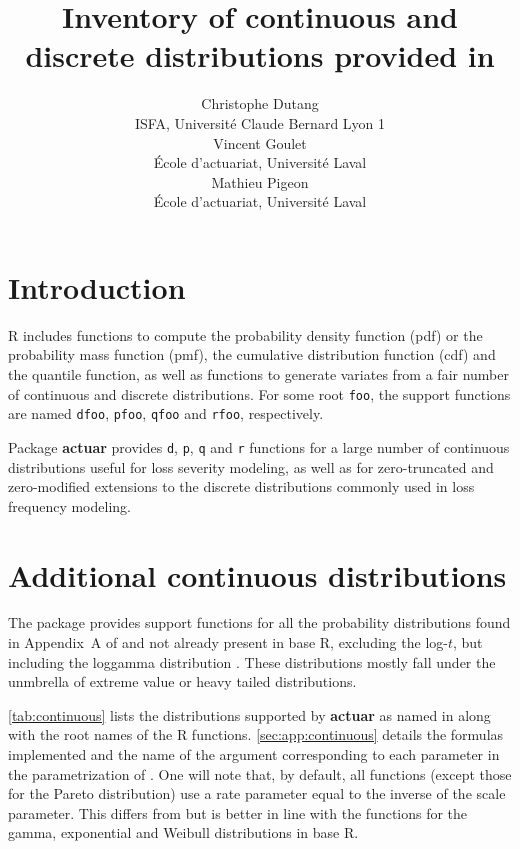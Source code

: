 \documentclass[x11names]{article}
\title{Inventory of continuous and discrete distributions provided
    in \pkg{actuar}}
\author{Christophe Dutang \\ ISFA, Université Claude Bernard Lyon 1 \\[3ex]
    Vincent Goulet \\ École d'actuariat, Université Laval \\[3ex]
    Mathieu Pigeon \\ École d'actuariat, Université Laval}
\date{}
\newcommand{\proglang}[1]{\textsf{#1}}
\newcommand{\pkg}[1]{\textbf{#1}}
\newcommand{\code}[1]{\texttt{#1}}
\begin{document}
\maketitle

\section{Introduction}
\label{sec:introduction}

\proglang{R} includes functions to compute the probability density
function (pdf) or the probability mass function (pmf), the cumulative
distribution function (cdf) and the quantile function, as well as
functions to generate variates from a fair number of continuous and
discrete distributions. For some root \code{foo}, the support
functions are named \code{dfoo}, \code{pfoo}, \code{qfoo} and
\code{rfoo}, respectively.

Package \pkg{actuar} provides \code{d}, \code{p}, \code{q} and
\code{r} functions for a large number of continuous distributions
useful for loss severity modeling, as well as for zero-truncated and
zero-modified extensions to the discrete distributions commonly used
in loss frequency modeling.


\section{Additional continuous distributions}
\label{sec:continuous}

The package provides support functions for all the probability
distributions found in Appendix~A of \cite{LossModels4e} and not
already present in base \proglang{R}, excluding the log-$t$, but
including the loggamma distribution \citep{HoggKlugman}. These
distributions mostly fall under the unmbrella of extreme value or
heavy tailed distributions.

\autoref{tab:continuous} lists the distributions supported by
\pkg{actuar} as named in \cite{LossModels4e} along with the root names
of the \proglang{R} functions. \autoref{sec:app:continuous} details
the formulas implemented and the name of the argument corresponding to
each parameter in the parametrization of \cite{LossModels4e}. One will
note that, by default, all functions (except those for the Pareto
distribution) use a rate parameter equal to the inverse of the scale
parameter. This differs from \cite{LossModels4e} but is better in line
with the functions for the gamma, exponential and Weibull
distributions in base \proglang{R}.
\end{document}
